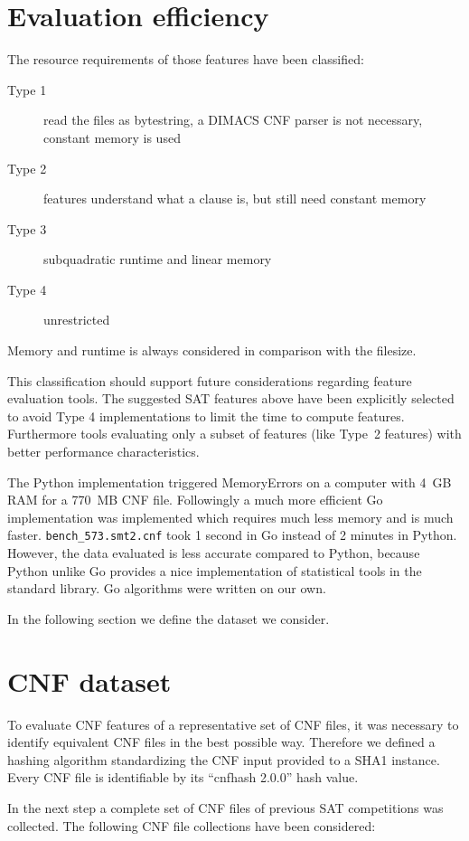 \section{Evaluation efficiency}
\label{sec:features-efficiency}
%
The resource requirements of those features have been classified:
\begin{description}
  \item[Type 1] read the files as bytestring, a DIMACS CNF parser is not necessary, constant memory is used
  \item[Type 2] features understand what a clause is, but still need constant memory
  \item[Type 3] subquadratic runtime and linear memory
  \item[Type 4] unrestricted
\end{description}
%
Memory and runtime is always considered in comparison with the filesize.

This classification should support future considerations regarding feature evaluation tools.
The suggested SAT features above have been explicitly selected to avoid Type 4 implementations to limit the time to compute features.
Furthermore tools evaluating only a subset of features (like Type~2 features) with better performance characteristics.

The Python implementation triggered MemoryErrors on a computer with 4~GB RAM for a 770~MB CNF file.
Followingly a much more efficient Go implementation was implemented which requires much less memory and is much faster.
\texttt{bench\_573.smt2.cnf} took 1 second in Go instead of 2 minutes in Python.
However, the data evaluated is less accurate compared to Python, because Python unlike Go provides a nice implementation of statistical tools in the standard library. Go algorithms were written on our own.

In the following section we define the dataset we consider.

\section{CNF dataset}
\label{sec:features-dataset}
%
To evaluate CNF features of a representative set of CNF files, it was necessary to identify equivalent CNF files in the best possible way.
Therefore we defined a hashing algorithm standardizing the CNF input provided to a SHA1 instance. Every CNF file is identifiable by its
\enquote{cnfhash 2.0.0} hash value.

In the next step a complete set of CNF files of previous SAT competitions was collected.
The following CNF file collections have been considered:

